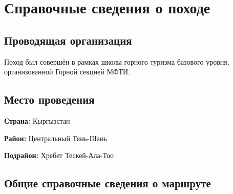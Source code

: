 \section{Справочные сведения о походе} 
\subsection{Проводящая организация}
Поход был совершён в рамках школы горного туризма базового уровня, организованной Горной секцией МФТИ.


\subsection{Место проведения}
\textbf{Страна:} Кыргызстан

\textbf{Район:} Центральный Тянь-Шань

\textbf{Подрайон:} Хребет Тескей-Ала-Тоо


\subsection{Общие справочные сведения о маршруте}

